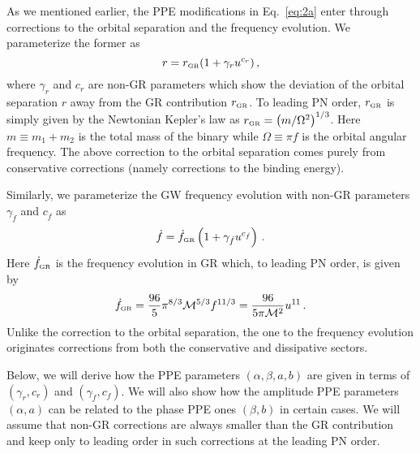 \documentclass[prd,twocolumn,nofootinbib]{revtex4-1}
\newcommand{\GR}{{\mbox{\tiny GR}}}
\begin{document}
As we mentioned earlier, the PPE modifications in Eq.~\eqref{eq:2a} enter through corrections to the orbital separation and the frequency evolution.
We parameterize the former as
 \begin{equation}
 \label{eq:2k}
 r=r_{\GR}(1+\gamma_r u^{c_r})\,,
 \end{equation}
where $\gamma_r$ and $c_r$ are non-GR parameters which show the deviation of the orbital separation $r$ away from the GR contribution $r_{\GR}$. To leading PN order, $r_{\GR}$ is simply given by the Newtonian Kepler's law as $r_{\GR}=\left(m/\Omega^2\right)^{1/3}$. Here $m\equiv m_1+m_2$ is the total mass of the binary while $\Omega\equiv\pi f $ is the orbital angular frequency. The above correction to the orbital separation comes purely from conservative corrections (namely corrections to the binding energy).


Similarly, we parameterize the GW frequency evolution with non-GR parameters $\gamma_{\dot{f}}$ and $c_{\dot{f}}$  as
\begin{equation}\label{eq:2m}
\dot{f}=\dot{f}_{\GR}\left(1+\gamma_{\dot{f}}u^{c_{\dot{f}}}\right)\,.
\end{equation}
Here $\dot{f}_{\GR}$ is the frequency evolution in GR which, to leading PN order, is given by~\cite{cutlerflanagan,Blanchet:1995ez}
\begin{align}\label{eq:2s}
\dot{f}_{\GR}=\frac{96}{5}\pi^{8/3}\mathcal{M}^{5/3}f^{11/3}=\frac{96}{5\pi\mathcal{M}^2}u^{11}\,.
\end{align}
Unlike the correction to the orbital separation, the one to the frequency evolution originates corrections from both the conservative and dissipative sectors.

Below, we will derive how the PPE parameters $(\alpha, \beta, a, b)$ are given in terms of $(\gamma_r,c_r)$ and $(\gamma_{\dot{f}},c_{\dot{f}})$. We will also show how the amplitude PPE parameters $(\alpha, a)$ can be related to the phase PPE ones $(\beta,b)$ in certain cases. We will assume that non-GR corrections are always smaller than the GR contribution and keep only to leading order in such corrections at the leading PN order.
\end{document}

